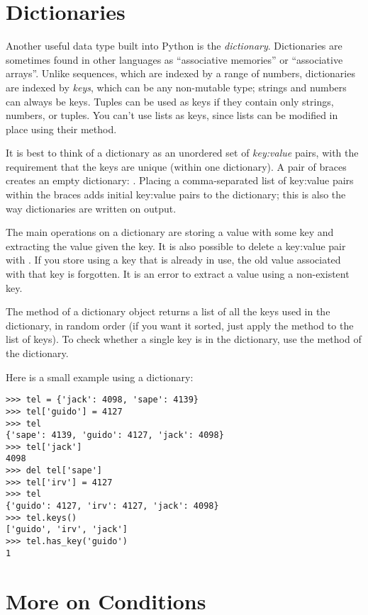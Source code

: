 \documentclass{manual}
\begin{document}
\section{Dictionaries \label{dictionaries}}

Another useful data type built into Python is the \emph{dictionary}.
Dictionaries are sometimes found in other languages as ``associative
memories'' or ``associative arrays''.  Unlike sequences, which are
indexed by a range of numbers, dictionaries are indexed by \emph{keys},
which can be any non-mutable type; strings and numbers can always be
keys.  Tuples can be used as keys if they contain only strings,
numbers, or tuples.  You can't use lists as keys, since lists can be
modified in place using their  method.

It is best to think of a dictionary as an unordered set of
\emph{key:value} pairs, with the requirement that the keys are unique
(within one dictionary).
A pair of braces creates an empty dictionary: \code{\{\}}.
Placing a comma-separated list of key:value pairs within the
braces adds initial key:value pairs to the dictionary; this is also the
way dictionaries are written on output.

The main operations on a dictionary are storing a value with some key
and extracting the value given the key.  It is also possible to delete
a key:value pair
with .
If you store using a key that is already in use, the old value
associated with that key is forgotten.  It is an error to extract a
value using a non-existent key.

The  method of a dictionary object returns a list of all the
keys used in the dictionary, in random order (if you want it sorted,
just apply the  method to the list of keys).  To check
whether a single key is in the dictionary, use the 
method of the dictionary.

Here is a small example using a dictionary:

\begin{verbatim}
>>> tel = {'jack': 4098, 'sape': 4139}
>>> tel['guido'] = 4127
>>> tel
{'sape': 4139, 'guido': 4127, 'jack': 4098}
>>> tel['jack']
4098
>>> del tel['sape']
>>> tel['irv'] = 4127
>>> tel
{'guido': 4127, 'irv': 4127, 'jack': 4098}
>>> tel.keys()
['guido', 'irv', 'jack']
>>> tel.has_key('guido')
1
\end{verbatim}

\section{More on Conditions \label{conditions}}
\end{document}
